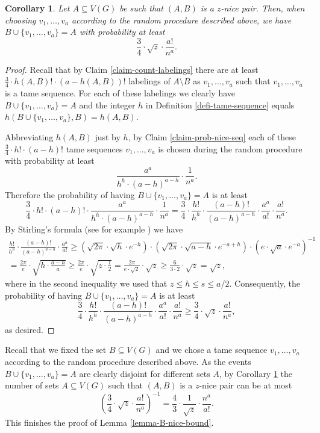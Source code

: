 \documentclass[11pt]{article}
\newtheorem{corollary}[theorem]{Corollary}
\theoremstyle{definition}
\numberwithin{equation}{section}
\begin{document}
\begin{corollary}\label{coro-A-nice} Let $A\subseteq V(G)$ be such that $(A,B)$ is a $z$-nice pair. Then, when choosing $v_1,\dots,v_a$ according to the random procedure described above, we have $B\cup \lbrace v_1,\dots,v_a\rbrace=A$ with probability at least
\[\frac{3}{4}\cdot \sqrt{z}\cdot \frac{a!}{n^a}.\]
\end{corollary}
\begin{proof}
Recall that by Claim \ref{claim-count-labelings} there are at least $\frac{3}{4}\cdot h(A,B)!\cdot (a-h(A,B))!$ labelings of $A\setminus B$ as $v_1,\dots,v_a$ such that $v_1,\dots,v_a$ is a tame sequence.  For each of these labelings we clearly have $B\cup \lbrace v_1,\dots,v_a\rbrace=A$ and the integer $h$ in Definition \ref{defi-tame-sequence} equals $h(B\cup \lbrace v_1,\dots,v_a\rbrace,B)=h(A,B)$.

Abbreviating $h(A,B)$ just by $h$, by Claim \ref{claim-prob-nice-seq} each of these $\frac{3}{4}\cdot h!\cdot (a-h)!$ tame sequences $v_1,\dots,v_a$ is chosen during the random procedure with probability at least
\[\frac{a^a}{h^h\cdot (a-h)^{a-h}}\cdot \frac{1}{n^a}.\]
Therefore the probability of having $B\cup \lbrace v_1,\dots,v_a\rbrace=A$ is at least
\[\frac{3}{4}\cdot h!\cdot (a-h)!\cdot \frac{a^a}{h^h\cdot (a-h)^{a-h}}\cdot \frac{1}{n^a}=\frac{3}{4}\cdot \frac{h!}{h^h}\cdot \frac{(a-h)!}{(a-h)^{a-h}}\cdot \frac{a^a}{a!}\cdot \frac{a!}{n^a}.\]
By Stirling's formula (see for example \cite{robbins}) we have
\begin{multline*}
\frac{h!}{h^h}\cdot \frac{(a-h)!}{(a-h)^{a-h}}\cdot \frac{a^a}{a!}\geq 
\left(\sqrt{2\pi}\cdot \sqrt{h}\cdot e^{-h}\right)\cdot \left(\sqrt{2\pi}\cdot \sqrt{a-h}\cdot e^{-a+h}\right)\cdot \left(e\cdot \sqrt{a}\cdot e^{-a}\right)^{-1}\\
=\frac{2\pi}{e}\cdot \sqrt{h\cdot\frac{a-h}{a}}\geq \frac{2\pi}{e}\cdot \sqrt{z\cdot\frac{1}{2}}=\frac{2\pi}{e\cdot \sqrt{2}}\cdot \sqrt{z}\geq \frac{6}{3\cdot 2}\cdot \sqrt{z}=\sqrt{z},
\end{multline*}
where in the second inequality we used that $z\leq h\leq s\leq a/2$. Consequently, the probability of having $B\cup \lbrace v_1,\dots,v_a\rbrace=A$ is at least
\[\frac{3}{4}\cdot\frac{h!}{h^h}\cdot \frac{(a-h)!}{(a-h)^{a-h}}\cdot \frac{a^a}{a!}\cdot \frac{a!}{n^a}\geq\frac{3}{4}\cdot \sqrt{z}\cdot \frac{a!}{n^a},\]
as desired.
\end{proof}
Recall that we fixed the set $B\subseteq V(G)$ and we chose a tame sequence $v_1,\dots,v_a$ according to the random procedure described above. As the events $B\cup \lbrace v_1,\dots,v_a\rbrace=A$ are clearly disjoint for different sets $A$, by Corollary \ref{coro-A-nice} the number of sets $A\subseteq V(G)$ such that $(A,B)$ is a $z$-nice pair can be at most
\[\left(\frac{3}{4}\cdot \sqrt{z}\cdot \frac{a!}{n^a}\right)^{-1}=\frac{4}{3}\cdot \frac{1}{\sqrt{z}}\cdot \frac{n^a}{a!}.\]
This finishes the proof of Lemma \ref{lemma-B-nice-bound}.
\end{document}
